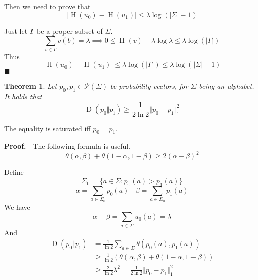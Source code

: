 \documentclass[aps,pra,onecolumn,notitlepage,superscriptaddress]{revtex4-1}
\newcommand{\spc}[1]{\mathcal{#1}}
\newcommand{\op}[1]{\operatorname{#1}}
\newtheorem{theo}{Theorem}
\def\Proof{{\bf Proof.~}}
\def\qed{$\blacksquare$ \newline}
\begin{document}
    Then we need to prove that
    \begin{equation*}
        |\op H(u_0) - \op H(u_1)| \leq \lambda \log (|\Sigma| - 1)
    \end{equation*}

    Just let $\Gamma$ be a proper subset of $\Sigma$.
    \begin{equation}
        \sum_{b \in \Gamma} v(b) = \lambda \implies 0 \leq \op H(v) + \lambda \log \lambda \leq \lambda \log (|\Gamma|)
    \end{equation}
    Thus
    \begin{equation}
        |\op H(u_0) - \op H(u_1)| \leq \lambda \log (|\Gamma|) \leq \lambda \log (|\Sigma|-1)
    \end{equation}
    \qed

    \begin{theo}
        Let $p_0, p_1 \in \spc P(\Sigma)$ be probability vectors, for $\Sigma$ being an alphabet. It holds that
        \begin{equation}
            \op D(p_0 \Vert p_1) \geq \frac{1}{2\ln 2} \Vert p_0-p_1 \Vert_1^2
        \end{equation}
    \end{theo}
    The equality is saturated iff $p_0 = p_1$.
    
    \Proof
    The following formula is useful.
    \begin{equation}
        \theta(\alpha, \beta) + \theta(1-\alpha, 1-\beta) \geq 2 (\alpha-\beta)^2
    \end{equation}

    Define
    \begin{equation*}
        \Sigma_0 = \{a \in \Sigma : p_0(a) > p_1(a)\}
    \end{equation*}
    \begin{equation}
        \alpha = \sum_{a \in \Sigma_0} p_0(a) \ \ \ \ \beta = \sum_{a \in \Sigma_0} p_1(a)
    \end{equation}
    We have
    \begin{equation}
        \alpha - \beta = \sum_{a \in \Sigma} u_0(a) = \lambda
    \end{equation}
    And
    \begin{align*}
        \op D(p_0 \Vert p_1) 
        &= \frac{1}{\ln 2} \sum_{a \in \Sigma} \theta(p_0(a), p_1(a)) \\ 
        &\geq \frac{1}{\ln 2}(\theta(\alpha, \beta) + \theta(1-\alpha, 1-\beta)) \\
        &\geq \frac{2}{\ln 2} \lambda^2 = \frac{1}{2\ln 2} \Vert p_0-p_1 \Vert_1^2
    \end{align*}
\end{document}
